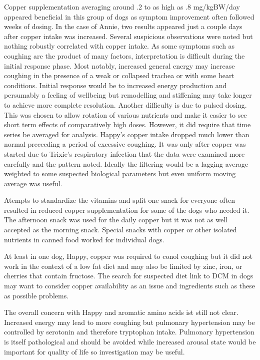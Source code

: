 Copper supplementation averaging around .2 to as high 
as .8 mg/kgBW/day appeared beneficial in this group of
dogs as symptom improvement often followed weeks of dosing.
In the case of Annie, two results appeared just a couple
days after copper intake was increased. 
Several suspicious observations were noted but nothing
robustly correlated with copper intake. 
As some symptoms such as coughing are the product
of many factors, interpretation is difficult during the 
initial response phase. Most notably, increased general
energy may increase coughing in the presence of a weak
or collapsed trachea or with some heart conditions. 
Initial response would be to increased energy production
and persumably a feeling of wellbeing but remodelling
and stiffening 
may take longer to  achieve  more complete  
resolution. Another difficulty is  due to pulsed dosing.
This was chosen to allow rotation of various
nutrients and make it easier to see short term effects
of comparatively high doses. However, it did require 
that time series be averaged  for analysis.
Happy's copper intake dropped much lower than normal
preceeding a period of excessive coughing. It was only
after copper was started due to Trixie's  respiratory infection
that the data were examined more carefully and the pattern
noted. Ideally the filtering would be a lagging average
weighted to some suspected biological parameters but
even uniform moving average was useful.   

Atempts to standardize the vitamins and split one snack
for everyone often resulted in reduced copper
supplementation for some of the dogs who needed it.
The afternoon snack was used for the daily copper 
but it was not as well accepted as the morning snack.
Special snacks with copper or other isolated nutrients
in canned food worked for individual dogs. 


At least in one dog, Happy, copper was required to conol
coughing but it did not work in the context of a low fat
diet and may also be limited by zinc, iron, or cherries
that contain fructose.  The search for suspected diet link to
DCM in dogs may want to consider copper availability as an
issue and ingredients such as these as possible problems.


The overall concern with Happy and aromatic amino acids
ist still not clear. Increased energy may lead to more
coughing but 
pulmonary hypertension may be controlled by serotonin
\cite{PMID27927914} and therefore tryptophan intake. 
Pulmonary hypertension is itself pathological and
should be avoided while increased arousal state would
be important for quality of life so investigation may be useful. 


